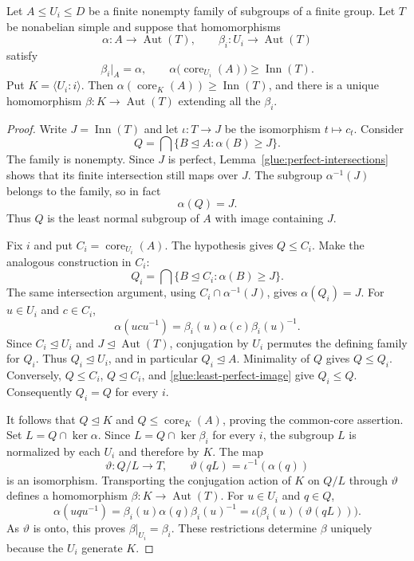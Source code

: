 \begin{lemma}
\label{glue:common-core}
Let $A\le U_i\le D$ be a finite nonempty family of subgroups of a finite
group.  Let $T$ be nonabelian simple and suppose that homomorphisms
\[
 \alpha:A\to\operatorname{Aut}(T),\qquad
 \beta_i:U_i\to\operatorname{Aut}(T)
\]
satisfy
\[
 \beta_i|_A=\alpha,
 \qquad
 \alpha\bigl(\operatorname{core}_{U_i}(A)\bigr)
                         \ge\operatorname{Inn}(T).
\]
Put $K=\langle U_i:i\rangle$.  Then
$\alpha(\operatorname{core}_K(A))\ge\operatorname{Inn}(T)$, and there
is a unique homomorphism $\beta:K\to\operatorname{Aut}(T)$ extending
all the $\beta_i$.
\end{lemma}
\begin{proof}
Write $J=\operatorname{Inn}(T)$ and let
$\iota:T\to J$ be the isomorphism $t\mapsto c_t$.
Consider
\[
 Q=\bigcap\{B\trianglelefteq A:\alpha(B)\ge J\}.
\]
The family is nonempty.  Since $J$ is perfect,
Lemma~\ref{glue:perfect-intersections} shows that its finite
intersection still maps over $J$.  The subgroup $\alpha^{-1}(J)$
belongs to the family, so in fact
\begin{equation}\label{glue:least-perfect-image}
                         \alpha(Q)=J.
\end{equation}
Thus $Q$ is the least normal subgroup of $A$ with image containing $J$.

Fix $i$ and put $C_i=\operatorname{core}_{U_i}(A)$.  The hypothesis
gives $Q\le C_i$.  Make the analogous construction in $C_i$:
\[
 Q_i=\bigcap\{B\trianglelefteq C_i:\alpha(B)\ge J\}.
\]
The same intersection argument, using $C_i\cap\alpha^{-1}(J)$,
gives $\alpha(Q_i)=J$.
For $u\in U_i$ and $c\in C_i$,
\[
       \alpha(ucu^{-1})
          =\beta_i(u)\alpha(c)\beta_i(u)^{-1}.
\]
Since $C_i\trianglelefteq U_i$ and
$J\trianglelefteq\operatorname{Aut}(T)$, conjugation by $U_i$ permutes
the defining family for $Q_i$.  Thus $Q_i\trianglelefteq U_i$, and in
particular $Q_i\trianglelefteq A$.  Minimality of $Q$ gives $Q\le Q_i$.
Conversely, $Q\le C_i$, $Q\trianglelefteq C_i$, and
\eqref{glue:least-perfect-image} give $Q_i\le Q$.
Consequently $Q_i=Q$ for every $i$.

It follows that $Q\trianglelefteq K$ and
$Q\le\operatorname{core}_K(A)$, proving the common-core assertion.
Set $L=Q\cap\ker\alpha$.  Since
$L=Q\cap\ker\beta_i$ for every $i$, the subgroup $L$ is normalized by
each $U_i$ and therefore by $K$.
The map
\[
 \vartheta:Q/L\longrightarrow T,
        \qquad \vartheta(qL)=\iota^{-1}(\alpha(q))
\]
is an isomorphism.  Transporting the conjugation action of $K$ on
$Q/L$ through $\vartheta$ defines a homomorphism
$\beta:K\to\operatorname{Aut}(T)$.
For $u\in U_i$ and $q\in Q$,
\[
 \alpha(uqu^{-1})
 =\beta_i(u)\alpha(q)\beta_i(u)^{-1}
 =\iota\bigl(\beta_i(u)(\vartheta(qL))\bigr).
\]
As $\vartheta$ is onto, this proves $\beta|_{U_i}=\beta_i$.
These restrictions determine $\beta$ uniquely because the $U_i$
generate $K$.
\end{proof}

